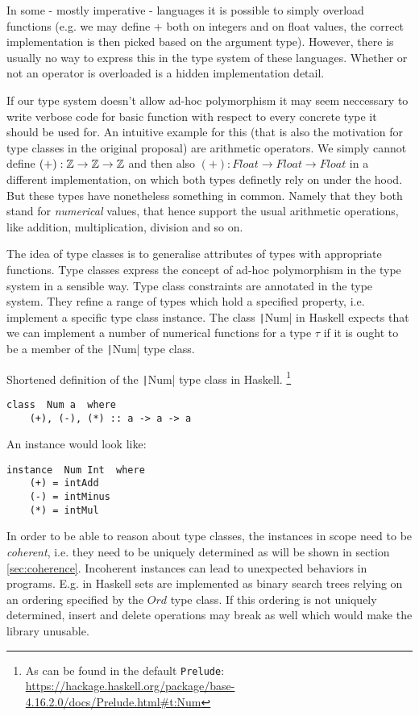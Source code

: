 In some - mostly imperative - languages it is possible to simply overload functions (e.g. we may define $+$ both on integers and on float values, the correct implementation is then picked based on the argument type).
However, there is usually no way to express this in the type system of these languages.
Whether or not an operator is overloaded is a hidden implementation detail. %

If our type system doesn't allow ad-hoc polymorphism it may seem neccessary to write verbose code for basic function with respect to every concrete type it should be used for.
An intuitive example for this (that is also the motivation for type classes in the original proposal) are arithmetic operators.
We simply cannot define $(+) : \mathbb{Z} \to \mathbb{Z} \to \mathbb{Z}$ and then also $(+) : \mathit{Float} \to \mathit{Float} \to \mathit{Float}$ in a different implementation, on which both types definetly rely on under the hood.
But these types have nonetheless something in common. Namely that they both stand for \emph{numerical} values, that hence support the usual arithmetic operations, like addition, multiplication, division and so on.

The idea of type classes is to generalise attributes of types with appropriate functions.
Type classes express the concept of ad-hoc polymorphism in the type system in a sensible  way.
Type class constraints are annotated in the type system. They refine a range of types which hold a specified property, i.e. implement a specific type class instance.
The class \texttt|Num| in Haskell expects that we can implement a number of numerical functions for a type $\tau$ if it is ought to be a member of the \texttt|Num| type class.

Shortened definition of the \texttt|Num| type class in Haskell.
\footnote{As can be found in the default \texttt{Prelude}: \url{https://hackage.haskell.org/package/base-4.16.2.0/docs/Prelude.html\#t:Num}}

\begin{verbatim}
class  Num a  where
    (+), (-), (*) :: a -> a -> a
\end{verbatim}

An instance would look like:

\begin{verbatim}
instance  Num Int  where
    (+) = intAdd
    (-) = intMinus
    (*) = intMul
\end{verbatim}


In order to be able to reason about type classes, the instances in scope need to be \emph{coherent}, i.e. they need to be uniquely determined as will be shown in section \ref{sec:coherence}.
Incoherent instances can lead to unexpected behaviors in programs.
E.g. in Haskell sets are implemented as binary search trees relying on an ordering specified by the $Ord$ type class.
If this ordering is not uniquely determined, insert and delete operations may break as well which would make the library unusable. \cite{Kilpatrick2019-cy}


